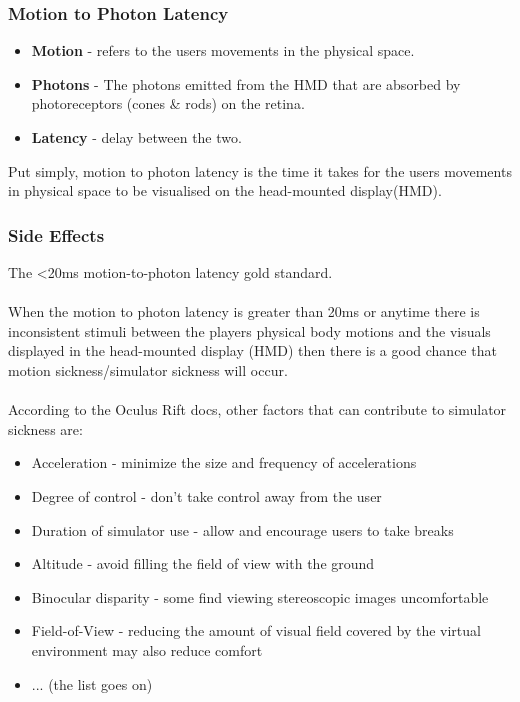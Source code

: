 \begin{frame}
	\frametitle{Motion to Photon Latency}
	\begin{itemize}
		\item \textbf{Motion} - refers to the users movements in the physical space.
		\item \textbf{Photons} - The photons emitted from the HMD that are absorbed by photoreceptors (cones \& rods) on the retina.
		\item \textbf{Latency} - delay between the two. 
	\end{itemize}
	
		Put simply, motion to photon latency is the time it takes for the users movements in physical space to be visualised on the head-mounted display(HMD).
	
\end{frame}

\begin{frame}
	\frametitle{Side Effects}
	The \textless20ms motion-to-photon latency gold standard. \\~\\
	
	When the motion to photon latency is greater than 20ms or anytime there is inconsistent stimuli between the players physical body motions and the visuals displayed in the head-mounted display (HMD) then there is a good chance that motion sickness/simulator sickness will occur. \\~\\

	According to the Oculus Rift docs, other factors that can contribute to simulator sickness are:

\end{frame}

\begin{frame}
		
	\begin{itemize}
		\item Acceleration - minimize the size and frequency of accelerations
		\item Degree of control - don't take control away from the user
		\item Duration of simulator use - allow and encourage users to take breaks
		\item Altitude - avoid filling the field of view with the ground
		\item Binocular disparity - some find viewing stereoscopic images uncomfortable
		\item Field-of-View - reducing the amount of visual field covered by the virtual environment may also reduce comfort
		\item ... (the list goes on)
	\end{itemize}
	
\end{frame}


